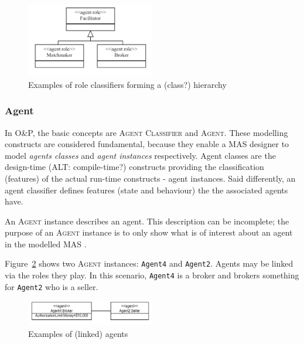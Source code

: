 \begin{figure}[ht]
	\centering
	\includegraphics[width=0.5\textwidth]{images/onp/role-classifier-examples.png}
	\caption{Examples of role classifiers forming a (class?) hierarchy}
	\label{figure:onp-role-classifier-examples}
\end{figure}

\subsubsection*{Agent}

In O\&P, the basic concepts are \textsc{Agent Classifier} and \textsc{Agent}.
These modelling constructs are considered fundamental, because they enable a MAS designer to model \textit{agents classes} and \textit{agent instances} respectively.
Agent classes are the design-time (ALT: compile-time?) constructs providing the classification (features) of the actual run-time constructs - agent instances.
Said differently, an agent classifier defines features (state and behaviour) the the associated agents have. 

An \textsc{Agent} instance describes an agent.
This description can be incomplete; the purpose of an \textsc{Agent} instance is to only show what is of interest about an agent in the modelled MAS \cite{Odell05}.

Figure~\ref{figure:onp-agent-examples} shows two \textsc{Agent} instances: \texttt{Agent4} and \texttt{Agent2}.
Agents may be linked via the roles they play.
In this scenario, \texttt{Agent4} is a broker and brokers something for \texttt{Agent2} who is a seller.

\begin{figure}[ht]
	\centering
	\includegraphics[width=0.5\textwidth]{images/onp/agent-examples.png}
	\caption{Examples of (linked) agents}
	\label{figure:onp-agent-examples}
\end{figure}

